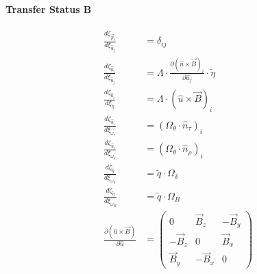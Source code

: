 \documentclass[review]{elsarticle}
\begin{document}
\paragraph{Transfer Status B}
\begin{equation} \begin{alignedat}{-1}
    \frac{d\zeta_{\vec{p}_{i}}}{d\xi_{\hat{u}_{j}}}&=\delta_{ij} \\
    \frac{d\zeta_{\hat{u}_{i}}}{d\xi_{\hat{u}_{j}}}&=\Lambda\cdot\frac{\partial(\hat{u}\times\vec{B})_{i}}{\partial\hat{u}_{j}}\cdot\tilde{\eta} \\
    \frac{d\zeta_{\hat{u}_{i}}}{d\xi_{\tilde{\eta}}}&=\Lambda\cdot(\hat{u}\times\vec{B})_{i} \\
    \frac{d\zeta_{\hat{u}_{i}}}{d\xi_{\omega_{\tau}}}&=(\Omega_{\theta}\cdot\hat{n}_{\tau})_{i} \\
    \frac{d\zeta_{\hat{u}_{i}}}{d\xi_{\omega_{\rho}}}&=(\Omega_{\theta}\cdot\hat{n}_{\rho})_{i} \\
    \frac{d\zeta_{\tilde{\eta}}}{d\xi_{\omega_{I}}}&=\tilde{q}\cdot\Omega_{\delta} \\
    \frac{d\zeta_{\tilde{\eta}}}{d\xi_{\omega_{B}}}&=\tilde{q}\cdot\Omega_{B} \\
    \frac{\partial(\hat{u}\times\vec{B})}{\partial\hat{u}}&=\left(\begin{array}{rrr}
        0            &  \vec{B}_{z} & -\vec{B}_{y} \\
        -\vec{B}_{z} &            0 &  \vec{B}_{x} \\
         \vec{B}_{y} & -\vec{B}_{x} &            0 
    \end{array}\right) \\
\end{alignedat} \end{equation} 
\end{document}
